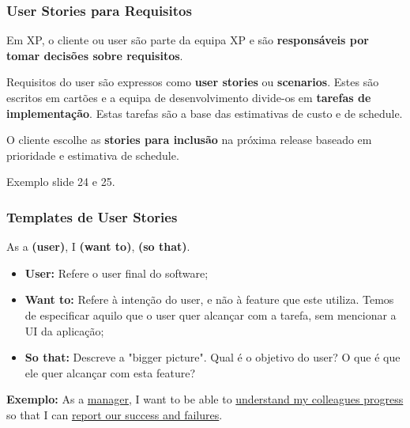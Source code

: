 \documentclass{article}
\begin{document}
\subsubsection{User Stories para Requisitos}

Em XP, o cliente ou user são parte da equipa XP e são
\textbf{responsáveis por tomar decisões sobre requisitos}.

\vspace{2mm}

Requisitos do user são expressos como \textbf{user stories} ou
\textbf{scenarios}. Estes são escritos em cartões e a equipa
de desenvolvimento divide-os em \textbf{tarefas de implementação}.
Estas tarefas são a base das estimativas de custo e de schedule.

\vspace{2mm}

O cliente escolhe as \textbf{stories para inclusão} na próxima release
baseado em prioridade e estimativa de schedule.

\vspace{2mm}

Exemplo slide 24 e 25.

\pagebreak

\subsubsection{Templates de User Stories}

\begin{center}
  As a \textbf{(user)}, I \textbf{(want to)}, \textbf{(so that)}.
\end{center}

\begin{itemize}
  \item \textbf{User:} Refere o user final do software;
  \item \textbf{Want to:} Refere à intenção do user, e não
  à feature que este utiliza. Temos de especificar aquilo que
  o user quer alcançar com a tarefa, sem mencionar a UI da aplicação;

  \item \textbf{So that:} Descreve a "bigger picture". Qual é o objetivo
  do user? O que é que ele quer alcançar com esta feature?
\end{itemize}


\begin{flushleft}
  \textbf{Exemplo:} As a \uline{manager}, I want to be able to
  \uline{understand my colleagues progress} so that I can
  \uline{report our success and failures}.
\end{flushleft}
\end{document}
